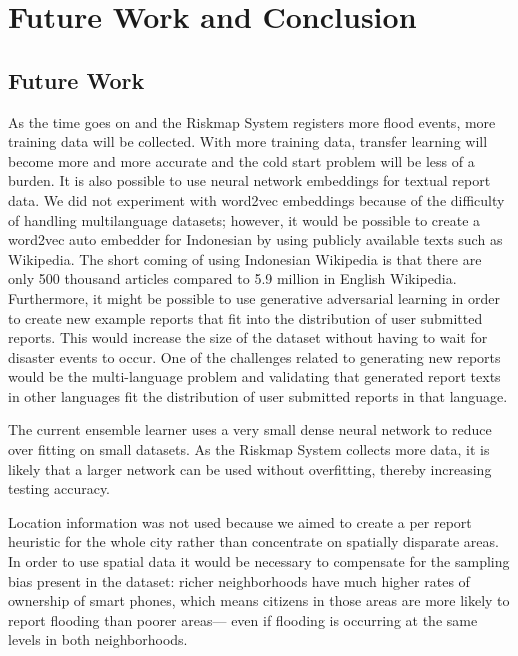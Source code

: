 \chapter{Future Work and Conclusion}

\section{Future Work} As the time goes on and the Riskmap System registers more
flood events, more training data will be collected. With more training data,
transfer learning will become more and more accurate and the cold start problem
will be less of a burden. It is also possible to use neural network embeddings
for textual report data. We did not experiment with word2vec embeddings because
of the difficulty of handling multilanguage datasets; however, it would be
possible to create a word2vec auto embedder for Indonesian by using publicly
available texts such as Wikipedia. The short coming of using Indonesian
Wikipedia is that there are only 500 thousand articles compared to 5.9 million
in English Wikipedia.
Furthermore, it might be possible to use generative adversarial learning in
order to create new example reports that fit into the distribution of user
submitted reports.  This would increase the size of the dataset without having
to wait for disaster events to occur. One of the challenges related to
generating new reports would be the multi-language problem and validating that
generated report texts in other languages fit the distribution of user submitted
reports in that language.

The current ensemble learner uses a very small dense neural network to reduce
over fitting on small datasets. As the Riskmap System collects more data, it
is likely that a larger network can be used without overfitting, thereby
increasing testing accuracy.

Location information was not used because we aimed to create a per report
heuristic for the whole city rather than concentrate on spatially disparate
areas. In order to use spatial data it would be necessary to compensate for the
sampling bias present in the dataset: richer neighborhoods have much higher
rates of ownership of smart phones, which means citizens in those areas are more
likely to report flooding than poorer areas--- even if flooding is occurring at
the same levels in both neighborhoods.

